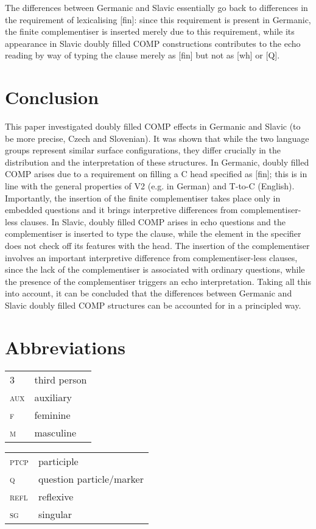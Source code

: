 \documentclass[output=paper,modfonts, hidelinks, newtxmath]{langscibook}
\begin{document}
The differences between Germanic and Slavic essentially go back to differences in the requirement of lexicalising [fin]: since this requirement is present in Germanic, the finite complementiser is inserted merely due to this requirement, while its appearance in Slavic doubly filled COMP constructions contributes to the echo reading by way of typing the clause merely as [fin] but not as [wh] or [Q].

\section{Conclusion}
This paper investigated doubly filled COMP effects in Germanic and Slavic (to be more precise, Czech and Slovenian). It was shown that while the two language groups represent similar surface configurations, they differ crucially in the distribution and the interpretation of these structures. In Germanic, doubly filled COMP arises due to a requirement on filling a C head specified as [fin]; this is in line with the general properties of V2 (e.g. in German) and T-to-C (English). Importantly, the insertion of the finite complementiser takes place only in embedded questions and it brings interpretive differences from complementiser-less clauses. In Slavic, doubly filled COMP arises in echo questions and the complementiser is inserted to type the clause, while the element in the specifier does not check off its features with the head. The insertion of the complementiser involves an important interpretive difference from complementiser-less clauses, since the lack of the complementiser is associated with ordinary questions, while the presence of the complementiser triggers an echo interpretation. Taking all this into account, it can be concluded that the differences between Germanic and Slavic doubly filled COMP structures can be accounted for in a principled way.

\section*{Abbreviations}

\begin{tabularx}{.5\textwidth}{@{}lQ@{}}
3&third person\\
\textsc{aux}&auxiliary\\
\textsc{f}&feminine\\
\textsc{m}&masculine\\
\end{tabularx}%
\begin{tabularx}{.5\textwidth}{@{}lQ@{}}
\textsc{ptcp}&participle\\
\textsc{q}&question particle/marker\\
\textsc{refl}&reflexive\\
\textsc{sg}&singular\\
\end{tabularx}
\end{document}

